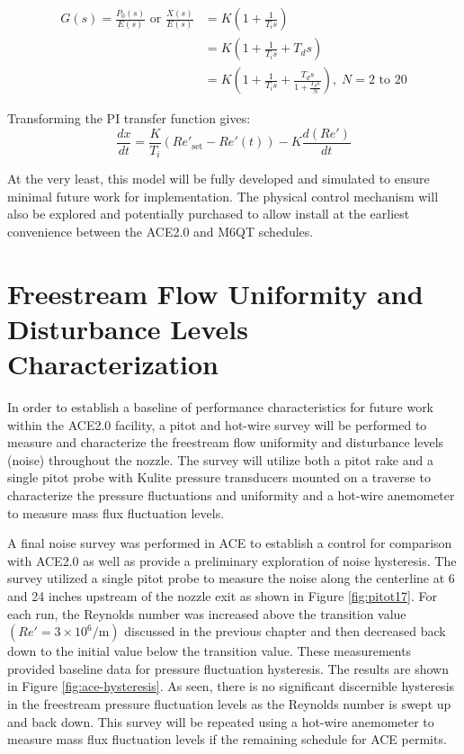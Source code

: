 \vspace{-1.5cm}
\begin{subequations}
    \begin{align}
        G(s) = \frac{P_0(s)}{E(s)} \textrm{ or } \frac{X(s)}{E(s)} &= K \left(1 + \frac{1}{T_i s}\right) \label{eq:Re-PI}\\
                                 &= K \left(1 + \frac{1}{T_i s} + T_d s\right) \label{eq:Re-PID}\\
                                 &= K \left(1 + \frac{1}{T_i s} + \frac{T_d s}{1+\frac{T_d s}{N}}\right), \; N=2\textrm{ to }20 \label{eq:Re-PID-filter}
    \end{align}
\end{subequations}

Transforming the PI transfer function gives:
\begin{equation}
    \frac{dx}{dt} = \frac{K}{T_i} \left(Re'_{\mathrm{set}} - Re'(t)\right) - K \frac{d(Re')}{dt}
\end{equation}

At the very least, this model will be fully developed and simulated to ensure minimal future work for implementation. The physical control mechanism will also be explored and potentially purchased to allow install at the earliest convenience between the ACE2.0 and M6QT schedules.

\section{Freestream Flow Uniformity and Disturbance Levels Characterization}

In order to establish a baseline of performance characteristics for future work within the ACE2.0 facility, a pitot and hot-wire survey will be performed to measure and characterize the freestream flow uniformity and disturbance levels (noise) throughout the nozzle. The survey will utilize both a pitot rake and a single pitot probe with Kulite pressure transducers mounted on a traverse to characterize the pressure fluctuations and uniformity and a hot-wire anemometer to measure mass flux fluctuation levels.

A final noise survey was performed in ACE to establish a control for comparison with ACE2.0 as well as provide a preliminary exploration of noise hysteresis. The survey utilized a single pitot probe to measure the noise along the centerline at 6 and 24 inches upstream of the nozzle exit as shown in Figure \ref{fig:pitot17}. For each run, the Reynolds number was increased above the transition value $\left(Re' = 3 \times 10^6/\mathrm{m}\right)$ discussed in the previous chapter and then decreased back down to the initial value below the transition value. These measurements provided baseline data for pressure fluctuation hysteresis. The results are shown in Figure \ref{fig:ace-hysteresis}. As seen, there is no significant discernible hysteresis in the freestream pressure fluctuation levels as the Reynolds number is swept up and back down. This survey will be repeated using a hot-wire anemometer to measure mass flux fluctuation levels if the remaining schedule for ACE permits.


